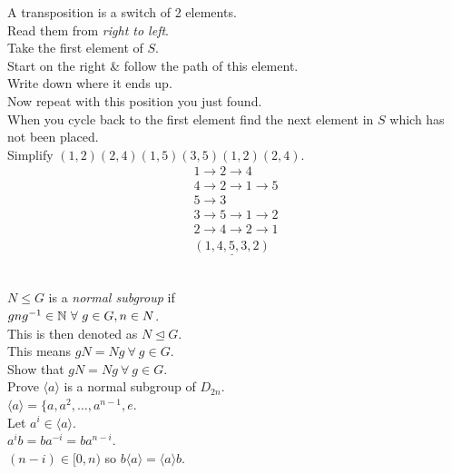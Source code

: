 \documentclass[11pt,a4paper]{article}
\begin{document}
\newpage{}

A transposition is a switch of 2 elements.\\
Read them from \textit{right to left}.\\

Take the first element of $S$.\\
Start on the right \& follow the path of this element.\\
Write down where it ends up.\\
Now repeat with this position you just found.\\
When you cycle back to the first element find the next element in $S$ which has not been placed.\\

Simplify $(1,2)(2,4)(1,5)(3,5)(1,2)(2,4)$.\\
\[\begin{array}{l}
1\to2\to4\\
4\to2\to1\to5\\
5\to3\\
3\to5\to1\to2\\
2\to4\to2\to1\\
\underline{(1,4,5,3,2)}
\end{array}\]\\


$N\leq G$ is a \textit{normal subgroup} if\\
\-\hspace{2em}$gng^{-1}\in\mathbb{N}\ \forall\ g\in G, n\in N$.\\
This is then denoted as $N\trianglelefteq G$.\\
This means $gN=Ng\ \forall\ g\in G$.\\

Show that $gN=Ng\ \forall\ g\in G$.\\

Prove $\langle a\rangle$ is a normal subgroup of $D_{2n}$.\\

\-\hspace{2em}$\langle a\rangle=\{a, a^2, \dots, a^{n-1}, e$.\\

\-\hspace{2em}Let $a^i \in \langle a \rangle$.\\
\-\hspace{2em}$a^ib = ba^{-i} = ba^{n-i}$.\\
\-\hspace{2em}$(n-i)\in [0,n)$ so $b\langle a \rangle = \langle a \rangle b$.\\
\end{document}
